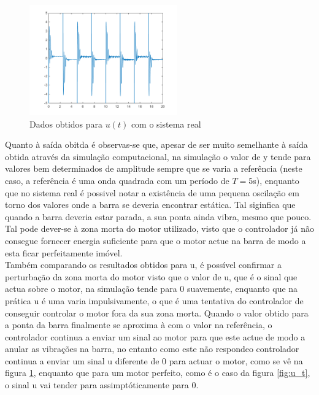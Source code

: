 \documentclass[%
  reprint,
  nofootinbib,
  amsmath,amssymb,
  aps,
  10pt,
  a4paper
]{revtex4-1}
\begin{document}
\begin{figure}
\includegraphics[width=2.5in]{../img/u_dados_01.png}
\caption{Dados obtidos para $u(t)$ com o sistema real}
\label{fig:u_d}
\end{figure}
Quanto à saída obitda é observas-se que, apesar de ser muito semelhante à saída obtida através da simulação computacional, na simulação o valor de y tende para valores bem determinados de amplitude sempre que se varia a referência (neste caso, a referência é uma onda quadrada com um período de $T=5$s), enquanto que no sistema real é possivel notar a existência de uma pequena oscilação em torno dos valores onde a barra se deveria encontrar estática. Tal siginfica que quando a barra deveria estar parada, a sua ponta ainda vibra, mesmo que pouco. Tal pode dever-se à zona morta do motor utilizado, visto que o controlador já não consegue fornecer energia suficiente para que o motor actue na barra de modo a esta ficar perfeitamente imóvel.\\
Também comparando os resultados obtidos para u, é possível confirmar a perturbação da zona morta do motor visto que o valor de u, que é o sinal que actua sobre o motor,  na simulação tende para 0 suavemente, enquanto que na prática u é uma varia impulsivamente, o que é uma tentativa do controlador de conseguir controlar o motor fora da sua zona morta. Quando o valor obtido para a ponta da barra finalmente se aproxima à com o valor na referência, o controlador continua a enviar um sinal ao motor para que este actue de modo a anular as vibrações na barra, no entanto como este não respondeo controlador continua a enviar um  sinal u diferente de 0 para actuar o motor, como se vê na figura \ref{fig:u_d}, enquanto que para um motor perfeito, como é o caso da figura \ref{fig:u_t}, o sinal u vai tender para assimptóticamente para 0.
\end{document}
